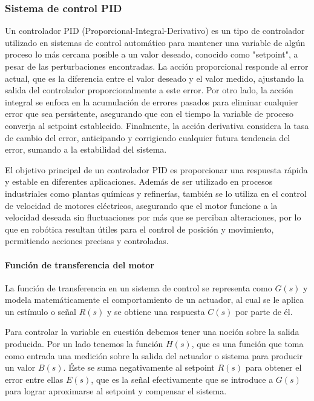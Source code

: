 \subsubsection{Sistema de control PID}
Un controlador PID (Proporcional-Integral-Derivativo) es un tipo de controlador utilizado en sistemas de control automático para mantener una variable de algún proceso lo más cercana posible a un valor deseado, conocido como "setpoint", a pesar de las perturbaciones encontradas. La acción proporcional responde al error actual, que es la diferencia entre el valor deseado y el valor medido, ajustando la salida del controlador proporcionalmente a este error. Por otro lado, la acción integral se enfoca en la acumulación de errores pasados para eliminar cualquier error que sea persistente, asegurando que con el tiempo la variable de proceso converja al setpoint establecido. Finalmente, la acción derivativa considera la tasa de cambio del error, anticipando y corrigiendo cualquier futura tendencia del error, sumando a la estabilidad del sistema.

El objetivo principal de un controlador PID es proporcionar una respuesta rápida y estable en diferentes aplicaciones. Además de ser utilizado en procesos industriales como plantas químicas y refinerías, también se lo utiliza en el control de velocidad de motores eléctricos, asegurando que el motor funcione a la velocidad deseada sin fluctuaciones por más que se perciban alteraciones, por lo que en robótica resultan útiles para el control de posición y movimiento, permitiendo acciones precisas y controladas. \cite{ogatacontrol}

\paragraph{Función de transferencia del motor} \mbox{} \vspace{8pt}

La función de transferencia en un sistema de control se representa como $G(s)$ y modela matemáticamente el comportamiento de un actuador, al cual se le aplica un estímulo o señal $R(s)$ y se obtiene una respuesta $C(s)$ por parte de él.

Para controlar la variable en cuestión debemos tener una noción sobre la salida producida. Por un lado tenemos la función $H(s)$, que es una función que toma como entrada una medición sobre la salida del actuador o sistema para producir un valor $B(s)$. Éste se suma negativamente al setpoint $R(s)$ para obtener el error entre ellas $E(s)$, que es la señal efectivamente que se introduce a $G(s)$ para lograr aproximarse al setpoint y compensar el sistema.

